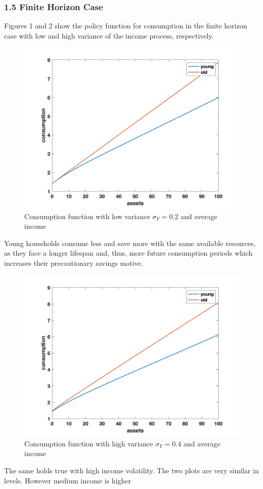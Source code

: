 \documentclass[letterpaper,12pt]{article}
\begin{document}
\subsubsection*{1.5 Finite Horizon Case}
Figures 1 and 2 show the policy function for consumption in the finite horizon case with low and high variance of the income process, respectively. 
\begin{figure}
\includegraphics[scale=0.5]{Figures/Part1_PE/consFunc_fin_low}
\caption{Consumption function with low variance $\sigma_Y = 0.2$ and average income}
\end{figure}
Young households consume less and save more with the same available resources, as they face a longer lifespan and, thus, more future consumption periods which increases their precautionary savings motive.
\begin{figure}
\includegraphics[scale=0.45]{Figures/Part1_PE/consFunc_fin_high}
\caption{Consumption function with high variance $\sigma_Y = 0.4$ and average income}
\end{figure}
The same holds true with high income volatility. The two plots are very similar in levels. However medium income is higher 
\end{document}
